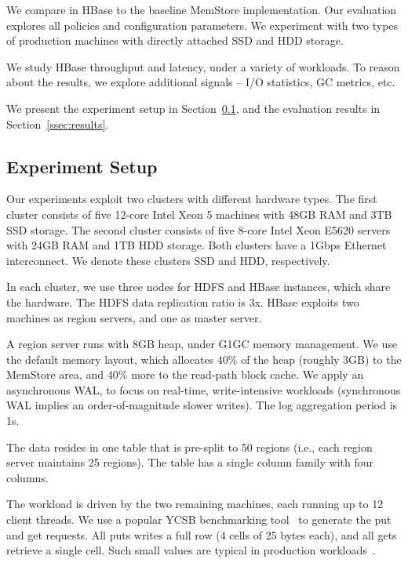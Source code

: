 We compare \sys\/ in HBase to the baseline MemStore implementation.  
Our evaluation explores all \sys\/ policies and configuration parameters.  
We experiment with two types of production machines with directly attached SSD 
and HDD storage. 

We study HBase throughput and latency, under a variety of workloads. 
To reason about the results, we explore additional signals -- I/O statistics, 
GC metrics, etc.  

We present the experiment setup in Section~\ref{ssec:setup}, and the evaluation 
results in Section~\ref{ssec:results}. 

\subsection{Experiment Setup}
\label{ssec:setup}

Our experiments exploit two clusters with different hardware types. The first cluster consists of five 12-core Intel Xeon 5 
machines with 48GB RAM and 3TB SSD storage. The second cluster consists of five 8-core Intel Xeon E5620 servers 
with 24GB RAM and 1TB HDD storage. Both clusters have a 1Gbps Ethernet interconnect. We denote these clusters 
SSD and HDD, respectively.

In each cluster, we use three nodes for HDFS and HBase instances, which share the hardware. The HDFS data 
replication ratio is 3x. HBase exploits two machines as region servers, and one as master server. 

A region server runs  with 8GB heap, under G1GC memory management. 
We use the default memory layout,  which allocates $40\%$ of the heap (roughly 3GB) to the MemStore 
area, and $40\%$ more to the read-path block cache. We apply an asynchronous WAL, to focus on real-time, 
write-intensive workloads (synchronous WAL implies an order-of-magnitude slower writes). The log aggregation
period is 1s. 

The data resides in one table that is pre-split to 50 regions (i.e., each region server maintains 25 regions). 
The table has a single column family with four columns. 

The workload is driven by the two remaining machines, each running up to 12 client threads. 
We use a popular YCSB benchmarking tool~\cite{Cooper:2010:BCS:1807128.1807152} to generate 
the put and get requests. All puts writes a full row (4 cells of 25 bytes each), and all gets retrieve
a single cell. Such small values are typical in production workloads~\cite{Wu2015}. 

